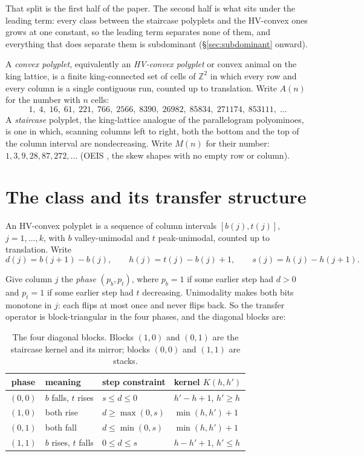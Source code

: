 \documentclass[11pt]{article}
\newcommand{\Z}{\mathbb{Z}}
\begin{document}
That split is the first half of the paper. The second half is what sits under
the leading term: every class between the staircase polyplets and the HV-convex
ones grows at one constant, so the leading term separates none of them, and
everything that does separate them is subdominant (\S\ref{sec:subdominant}
onward).

\begin{definition}
A \emph{convex polyplet}, equivalently an \emph{HV-convex polyplet} or convex
animal on the king lattice, is a finite king-connected set of cells of $\Z^2$ in
which every row and every column is a single contiguous run, counted up to
translation. Write $A(n)$ for the number with $n$ cells:
\[
  1,\; 4,\; 16,\; 61,\; 221,\; 766,\; 2566,\; 8390,\; 26982,\; 85834,\;
  271174,\; 853111,\; \dots
\]
A \emph{staircase} polyplet, the king-lattice analogue of the parallelogram
polyominoes, is one in which, scanning columns left to right,
both the bottom and the top of the column interval are nondecreasing. Write
$M(n)$ for their number: $1, 3, 9, 28, 87, 272, \dots$ (OEIS , the skew shapes with no empty row or column).
\end{definition}

\section{The class and its transfer structure}
\label{sec:structure}

An HV-convex polyplet is a sequence of column intervals $[b(j), t(j)]$,
$j = 1,\dots,k$, with $b$ valley-unimodal and $t$ peak-unimodal, counted up to
translation. Write
\[
  d(j) = b(j{+}1) - b(j), \qquad h(j) = t(j) - b(j) + 1, \qquad
  s(j) = h(j) - h(j{+}1).
\]

Give column $j$ the \emph{phase} $(p_b, p_t)$, where $p_b = 1$ if some earlier
step had $d > 0$ and $p_t = 1$ if some earlier step had $t$ decreasing.
Unimodality makes both bits monotone in $j$: each flips at most once and never
flips back. So the transfer operator is block-triangular in the four phases, and
the diagonal blocks are:

\begin{table}[H]
\centering\small
\begin{tabular}{c l l l}
\toprule
phase & meaning & step constraint & kernel $K(h,h')$ \\
\midrule
$(0,0)$ & $b$ falls, $t$ rises & $s \le d \le 0$ & $h'-h+1$, \; $h' \ge h$ \\
$(1,0)$ & both rise & $d \ge \max(0,s)$ & $\min(h,h')+1$ \\
$(0,1)$ & both fall & $d \le \min(0,s)$ & $\min(h,h')+1$ \\
$(1,1)$ & $b$ rises, $t$ falls & $0 \le d \le s$ & $h-h'+1$, \; $h' \le h$ \\
\bottomrule
\end{tabular}
\caption{The four diagonal blocks. Blocks $(1,0)$ and $(0,1)$ are the staircase
kernel and its mirror; blocks $(0,0)$ and $(1,1)$ are stacks.}
\label{tab:blocks}
\end{table}
\end{document}
